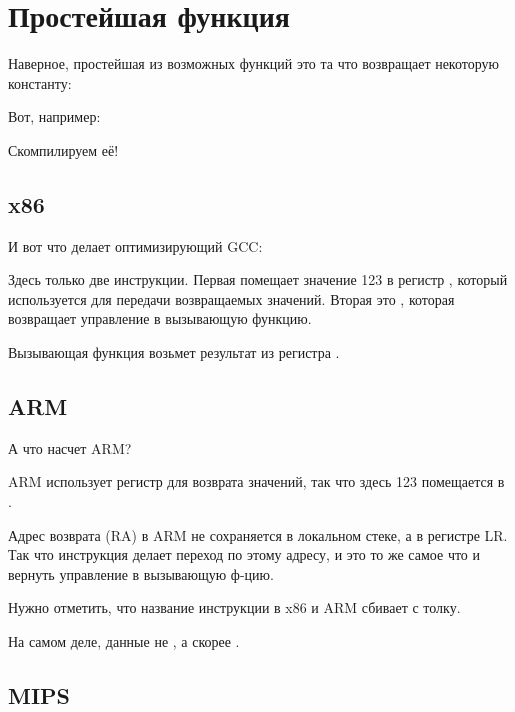 \chapter{Простейшая функция}

Наверное, простейшая из возможных функций это та что возвращает некоторую константу:

Вот, например:



Скомпилируем её!

\section{x86}

И вот что делает оптимизирующий GCC:



Здесь только две инструкции. Первая помещает значение 123 в регистр \EAX, который используется
для передачи возвращаемых значений. Вторая это \RET, которая возвращает управление в вызывающую функцию.

Вызывающая функция возьмет результат из регистра \EAX.

\ifdefined\IncludeARM
\section{ARM}

А что насчет ARM?



ARM использует регистр  для возврата значений, так что здесь 123 помещается в .

Адрес возврата (\ac{RA}) в ARM не сохраняется в локальном стеке, а в регистре \ac{LR}.
Так что инструкция  делает переход по этому адресу, и это то же самое что и вернуть управление
в вызывающую ф-цию.
\fi %

Нужно отметить, что название инструкции \MOV в x86 и ARM сбивает с толку.

На самом деле, данные не , а скорее .

\ifdefined\IncludeMIPS
\section{MIPS}

